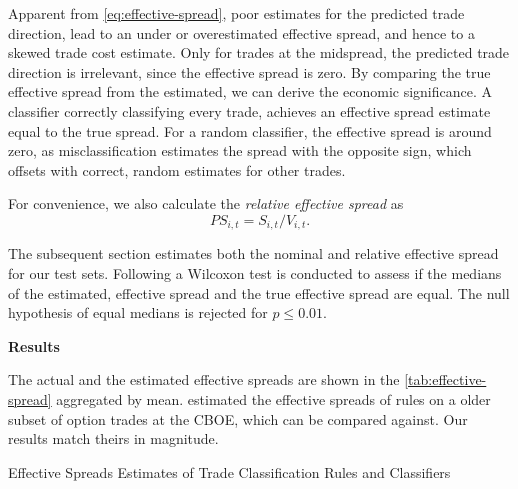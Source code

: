 Apparent from \cref{eq:effective-spread}, poor estimates for the predicted trade direction, lead to an under or overestimated effective spread, and hence to a skewed trade cost estimate. Only for trades at the midspread, the predicted trade direction is irrelevant, since the effective spread is zero. By comparing the true effective spread from the estimated, we can derive the economic significance. A classifier correctly classifying every trade, achieves an effective spread estimate equal to the true spread. For a random classifier, the effective spread is around zero, as misclassification estimates the spread with the opposite sign, which offsets with correct, random estimates for other trades.

For convenience, we also calculate the \emph{relative effective spread} as
\begin{equation}
    {PS}_{i,t} = S_{i,t} / V_{i,t}.
\end{equation}


The subsequent section estimates both the nominal and relative effective spread for our test sets. Following \textcite[][12]{theissenTestAccuracyLee2000} a Wilcoxon test is conducted to assess if the medians of the estimated, effective spread and the true effective spread are equal. The null hypothesis of equal medians is rejected for $p \leq 0.01$.

\textbf{Results}

The actual and the estimated effective spreads are shown in the \cref{tab:effective-spread} aggregated by mean. \textcite[][896--897]{savickasInferringDirectionOption2003} estimated the effective spreads of rules on a older subset of option trades at the \gls{CBOE}, which can be compared against. Our results match theirs in magnitude.

\begin{table}[!ht]
    \centering
    
    \caption{Effective Spreads Estimates of Trade Classification Rules and Classifiers}
    \label{tab:effective-spread}
\end{table}

